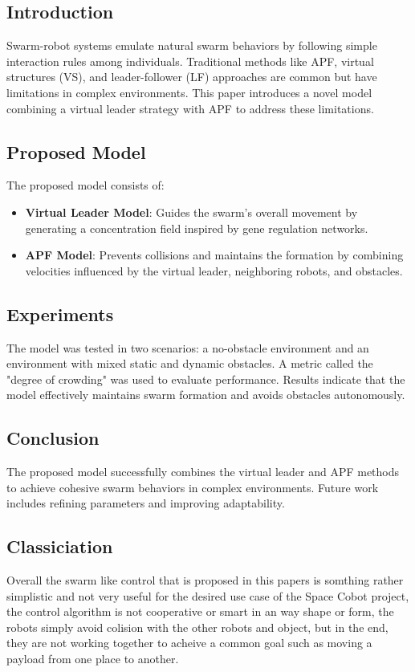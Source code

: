\documentclass[a4paper,12pt]{article}
\begin{document}
\subsection{Introduction}
Swarm-robot systems emulate natural swarm behaviors by following simple interaction rules among individuals. Traditional methods like APF, virtual structures (VS), and leader-follower (LF) approaches are common but have limitations in complex environments. This paper introduces a novel model combining a virtual leader strategy with APF to address these limitations.

\subsection{Proposed Model}
The proposed model consists of:
\begin{itemize}
	\item \textbf{Virtual Leader Model}: Guides the swarm’s overall movement by generating a concentration field inspired by gene regulation networks.
	\item \textbf{APF Model}: Prevents collisions and maintains the formation by combining velocities influenced by the virtual leader, neighboring robots, and obstacles.
\end{itemize}

\subsection{Experiments}
The model was tested in two scenarios: a no-obstacle environment and an environment with mixed static and dynamic obstacles. A metric called the "degree of crowding" was used to evaluate performance. Results indicate that the model effectively maintains swarm formation and avoids obstacles autonomously.

\subsection{Conclusion}
The proposed model successfully combines the virtual leader and APF methods to achieve cohesive swarm behaviors in complex environments. Future work includes refining parameters and improving adaptability.



\subsection{Classiciation}
Overall the swarm like control that is proposed in this papers is somthing rather simplistic and not very useful for the desired use case of the Space Cobot project, the control algorithm is not cooperative or smart in an way shape or form, the robots simply avoid colision with the other robots and object, but in the end, they are not working together to acheive a common goal such as moving a payload from one place to another.
\end{document}
